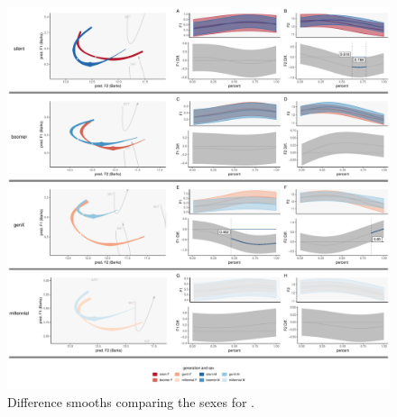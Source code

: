 \begin{figure}[p]
    \centering
    \includegraphics[width=\textwidth]{Figures/BAN/BAN_sex_panel_plot.pdf}
    \caption{Difference smooths comparing the sexes for \ban.}
    \label{fig:ban_diff_smooths_sex_gen}
\end{figure}



